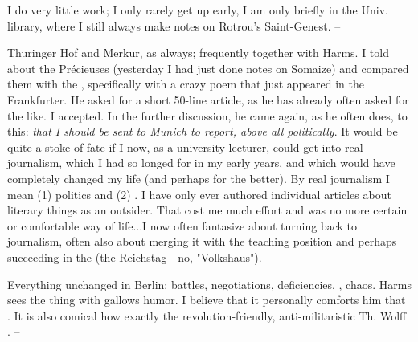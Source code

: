 
\missing

I do very little work; I only rarely get up early, I am only briefly in the Univ. library, where I still always make notes on Rotrou's Saint-Genest. --

Thuringer Hof and Merkur, as always; frequently together with Harms. I told about the Précieuses (yesterday I had just done notes on Somaize) and compared them with the , specifically with a crazy poem that just appeared in the Frankfurter. He asked for a short 50-line article, as he has already often asked for the like. I accepted. In the further discussion, he came again, as he often does, to this: \textit{that I should be sent to Munich to report, above all politically}. It would be quite a stoke of fate if I now, as a university lecturer, could get into real journalism, which I had so longed for in my early years, and which would have completely changed my life (and perhaps for the better). By real journalism I mean (1) politics and (2) . I have only ever authored individual articles about literary things as an outsider. That cost me much effort and was no more certain or comfortable way of life...I now often fantasize about turning back to journalism, often also about merging it with the teaching position and perhaps succeeding in the  (the Reichstag - no, "Volkshaus").

Everything unchanged in Berlin: battles, negotiations, deficiencies, , chaos. Harms sees the thing with gallows humor. I believe that it personally comforts him that . It is also comical how exactly the revolution-friendly, anti-militaristic Th. Wolff . --

